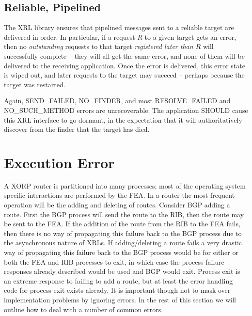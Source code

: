 \documentclass[11pt]{article}
\begin{document}
\subsection*{Reliable, Pipelined}

The XRL library ensures that pipelined messages sent to a reliable target
are delivered in order. In particular, if a request $R$ to a given target
gets an error, then no \emph{outstanding} requests to that target
\emph{registered later than $R$} will successfully complete -- they will
all get the same error, and none of them will be delivered to the receiving
application. Once the error is delivered, this error state is wiped out,
and later requests to the target may succeed -- perhaps because the target
was restarted.

Again, SEND\_FAILED, NO\_FINDER, and most RESOLVE\_FAILED and
NO\_SUCH\_METHOD errors are unrecoverable.
The application SHOULD cause this XRL interface to go dormant, in the
expectation that it will authoritatively discover from the finder that
the target has died.

\section{Execution Error}

A XORP router is partitioned into many processes; most of the operating
system specific interactions are performed by the FEA. In a router the
most frequent operation will be the adding and deleting of routes.
Consider BGP adding a route. First the BGP process will send the route
to the RIB, then the route may be sent to the FEA. If the addition of the
route from the RIB to the FEA fails, then there is no way of
propagating this failure back to the BGP process due to the
asynchronous nature of XRLs. If adding/deleting a route fails a very
drastic way of propagating this failure back to the BGP process would
be for either or both the FEA and RIB processes to exit, in which case
the process failure responses already described would be used and BGP
would exit. Process exit is an extreme response to failing
to add a route, but at least the error handling code for process exit
exists already. It is important though not
to mask over implementation problems by ignoring errors. In the rest
of this section we will outline how to deal with a number of common
errors.

\end{document}
